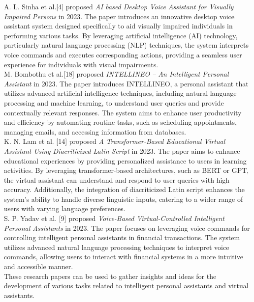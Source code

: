 \noindent
A. L. Sinha et al.[4] proposed {\it AI based Desktop Voice Assistant for Visually Impaired Persons} in 2023.
\noindent
The paper introduces an innovative desktop voice assistant system designed specifically to aid visually impaired individuals in performing various tasks. By leveraging artificial intelligence (AI) technology, particularly natural language processing (NLP) techniques, the system interprets voice commands and executes corresponding actions, providing a seamless user experience for individuals with visual impairments.\\

\noindent
M. Bombothu et al.[18] proposed {\it INTELLINEO – An Intelligent Personal Assistant} in 2023.
\noindent
The paper introduces INTELLINEO, a personal assistant that utilizes advanced artificial intelligence techniques, including natural language processing and machine learning, to understand user queries and provide contextually relevant responses. The system aims to enhance user productivity and efficiency by automating routine tasks, such as scheduling appointments, managing emails, and accessing information from databases. \\

\noindent
K. N. Lam et al. [14] proposed {\it A Transformer-Based Educational Virtual Assistant Using Diacriticized Latin Script} in 2023. 
\noindent
The paper aims to enhance educational experiences by providing personalized assistance to users in learning activities. By leveraging transformer-based architectures, such as BERT or GPT, the virtual assistant can understand and respond to user queries with high accuracy. Additionally, the integration of diacriticized Latin script enhances the system's ability to handle diverse linguistic inputs, catering to a wider range of users with varying language preferences.  \\

\noindent
S. P. Yadav et al. [9] proposed {\it Voice-Based Virtual-Controlled Intelligent Personal Assistants} in 2023.
\noindent
The paper focuses on leveraging voice commands for controlling intelligent personal assistants in financial transactions. The system utilizes advanced natural language processing techniques to interpret voice commands, allowing users to interact with financial systems in a more intuitive and accessible manner. \\

\noindent
These research papers can be used to gather insights and ideas for the development of various tasks related to intelligent personal assistants and virtual assistants.



